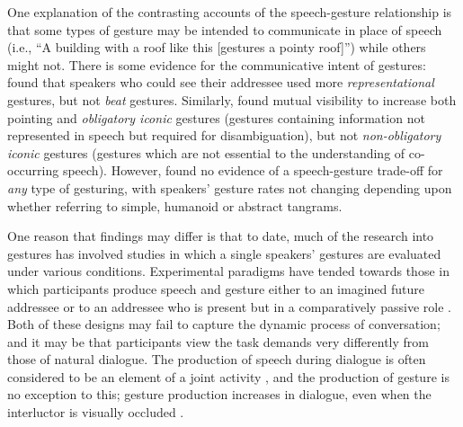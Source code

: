\documentclass[a4paper,man,natbib]{apa6}
\newcommand*{\spex}[1]{``{#1}''} %
\newcommand*{\term}[1]{\emph{#1}} %
\begin{document}
One explanation of the contrasting accounts of the speech-gesture relationship is that some types of gesture may be intended to communicate in place of speech (i.e., \spex{A building with a roof like this [gestures a pointy roof]}) while others might not.
There is some evidence for the communicative intent of gestures: \citet{Alibali2001} found that speakers who could see their addressee used more \term{representational} gestures, but not \term{beat} gestures. %
Similarly, \citet{DeRuiter2012} found mutual visibility to increase both pointing and \term{obligatory iconic} gestures (gestures containing information not represented in speech but required for disambiguation), but not \term{non-obligatory iconic} gestures (gestures which are not essential to the understanding of co-occurring speech).
However, \citet{DeRuiter2012} found no evidence of a speech-gesture trade-off for \emph{any} type of gesturing, with speakers' gesture rates not changing depending upon whether referring to simple, humanoid or abstract tangrams. 

One reason that findings may differ is that to date, much of the research into gestures has involved studies in which a single speakers' gestures are evaluated under various conditions.
Experimental paradigms have tended towards those in which participants produce speech and gesture either to an imagined future addressee \citep[e.g.,][]{Morsella2004, Wesp2001} or to an addressee who is present but in a comparatively passive role \citep[e.g.,][]{DeRuiter2012, Bangerter2004, Holler2007, Hoetjes2015}.
Both of these designs may fail to capture the dynamic process of conversation; and it may be that participants view the task demands very differently from those of natural dialogue.
The production of speech during dialogue is often considered to be an element of a joint activity \citep{Clark1996}, and the production of gesture is no exception to this; gesture production increases in dialogue, even when the interluctor is visually occluded \citep{Bavelas2008}.
\end{document}
